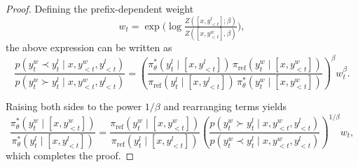 \documentclass{article}
\theoremstyle{plain}
\theoremstyle{definition}
\theoremstyle{remark}
\begin{document}
\begin{proof}
Defining the prefix-dependent weight
\[
w_t
=
\exp\!\Big(
\log \tfrac{Z([x,y^l_{<t}]; \beta)}{Z([x,y^w_{<t}], \beta)}
\Big),
\]
the above expression can be written as
\[
\frac{
p(y_t^w \prec y_t^l \mid x, y^w_{<t}, y^l_{<t})
}{
p(y_t^w \succ y_t^l \mid x, y^w_{<t}, y^l_{<t})
}
=
\left(
\frac{
\pi^*_\theta(y_t^l \mid [x,y^l_{<t}])\,
\pi_{\mathrm{ref}}(y_t^w \mid [x,y^w_{<t}])
}{
\pi_{\mathrm{ref}}(y_t^l \mid [x,y^l_{<t}])\,
\pi^*_\theta(y_t^w \mid [x,y^w_{<t}])
}
\right)^{\!\beta}
w_t^{\beta}.
\]

Raising both sides to the power $1/\beta$ and rearranging terms yields
\begin{equation*}
\frac{
\pi^*_\theta(y_t^w \mid [x,y^w_{<t}])
}{
\pi^*_\theta(y_t^l \mid [x,y^l_{<t}])
}
=
\frac{
\pi_{\mathrm{ref}}(y_t^w \mid [x,y^w_{<t}])
}{
\pi_{\mathrm{ref}}(y_t^l \mid [x,y^l_{<t}])
}
\left(
\frac{
p(y_t^w \succ y_t^l \mid x, y^w_{<t}, y^l_{<t})
}{
p(y_t^w \prec y_t^l \mid x, y^w_{<t}, y^l_{<t})
}
\right)^{1/\beta}
w_t,
\end{equation*}
which completes the proof.
\end{proof}
\end{document}
